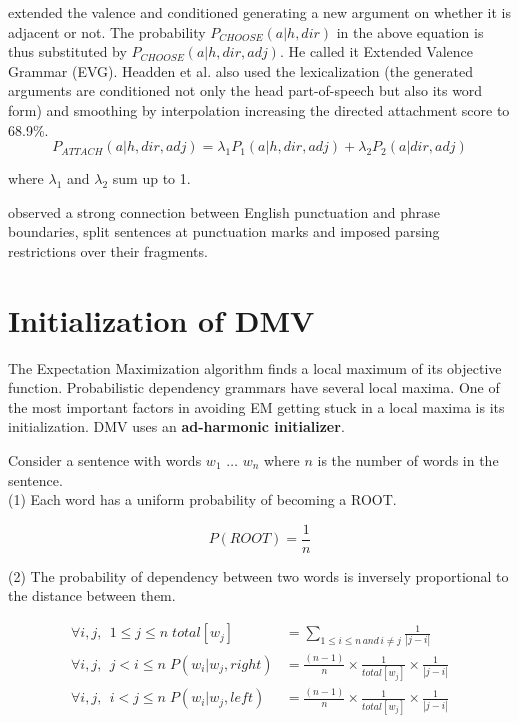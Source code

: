 \documentclass{book}
\begin{document}
\citep{headden2009} extended the valence and conditioned generating a new argument on whether it is adjacent or not. The probability $P_{CHOOSE}(a|h, dir)$ in the above equation is thus substituted by $P_{CHOOSE}(a|h, dir, adj)$. He called it Extended Valence Grammar (EVG). Headden et al. also used the lexicalization (the generated arguments are conditioned not only the head part-of-speech but also its word form) and smoothing by interpolation increasing the directed attachment score to 68.9\%.
$$P_{ATTACH}(a|h,dir,adj) = \lambda_1P_1(a|h,dir,adj) + \lambda_2P_2(a|dir,adj)$$

where $\lambda_1$ and $\lambda_2$ sum up to 1.
   
\citep{spitkovsky2011b} observed a strong connection between English punctuation and phrase boundaries, split sentences at punctuation marks and imposed parsing restrictions over their fragments.

\section{Initialization of DMV}

The Expectation Maximization algorithm finds a local maximum of its objective function. Probabilistic dependency grammars have several local maxima. One of the most important factors in avoiding EM getting stuck in a local maxima is its initialization. DMV uses an \textbf{ad-harmonic initializer}. 

Consider a sentence with words $w_1$ $\ldots$ $w_n$ where $n$ is the number of words in the sentence.\\

(1) Each word has a uniform probability of becoming a ROOT.

   $$ P(ROOT) =  \frac{1}{n} $$

(2) The probability of dependency between two words is inversely proportional to the distance between them.

\begin{align*}
  \forall{i,j},  \;\, 1 \le j \le n \; total[w_j] &= \sum_{1 \le i \le n \, and \, i \ne j} \frac{1}{|{j-i}|} \\
   \forall{i,j},  \;\, j < i \le n \; P(w_i| w_j, right)  &= \frac{(n-1)}{n} \times \frac{1}{total[w_j]} \times \frac{1}{|{j-i}|} \\
    \forall{i,j}, \;\, i < j \le n \; P(w_i| w_j, left)  &=  \frac{(n-1)}{n} \times \frac{1}{total[w_j]} \times \frac{1}{|{j-i}|}
\end{align*}
\end{document}
